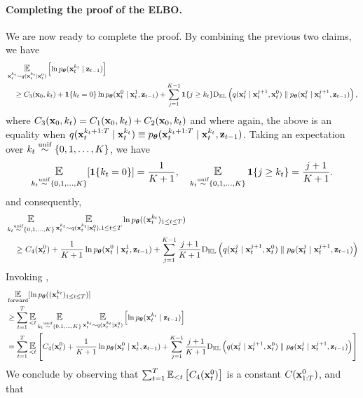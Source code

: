 \paragraph{Completing the proof of the ELBO.} We are now ready to complete the proof. By combining the previous two claims, we have
\begin{align*}
&\Exp_{\bx_t^{k_t} \sim q(\bx_t^{k_t} \mid \bx_t^0)}\left[\ln \ptheta(\bx_{t}^{k_t} \mid \bz_{t-1})\right] \\
&\quad\ge C_3(\bx_0,k_t) + \I\{k_t = 0\}\ln \ptheta(\bx_t^{0} \mid \bx_{t}^{1},  \bz_{t-1}) +  \sum_{j=1}^{K-1}\I\{j \ge k_t\}\Dkl\left(q(\bx_{t}^{j} \mid \bx_t^{j+1},\bx_t^0) \parallel \ptheta(\bx_{t}^{j} \mid \bx_{t}^{j+1}, \bz_{t-1})\right),
\end{align*}
where $C_3(\mathbf{x}_0,k_t) = C_1(\mathbf{x}_0,k_t)+C_2(\mathbf{x}_0,k_t)$ and where again, the above is an equality when $q(\mathbf{x}_{t}^{k_t+1:T} \mid \mathbf{x}_t^{k_t}) \equiv p_{\bm{\theta}}(\mathbf{x}_{t}^{k_t+1:T} \mid \mathbf{x}_t^{k_t},\mathbf{z}_{t-1})$. Taking an expectation over $k_t\overset{\mathrm{unif}}{\sim}\{0,1,\dots,K\}$, we have
\begin{align}
\Exp_{k_t \unifsim\{0,1,\dots,K\}}[\I\{k_t = 0\}] = \frac{1}{K+1}, \quad \Exp_{k_t \unifsim\{0,1,\dots,K\}}\I\{j \ge k_t\} = \frac{j+1}{K+1}.
\end{align}
and consequently,
\begin{align*}
&\Exp_{k_t \unifsim\{0,1,\dots,K\}}\Exp_{\bx_t^{k_t} \sim q(\bx_t^{k_t} \mid \bx_t^0), 1 \le t \le T} \ln \ptheta((\bx_{t}^{k_t})_{1 \le t \le T})\\
&\quad\ge C_4(\bx_t^0) +\frac{1}{K+1}\ln \ptheta(\bx_t^{0} \mid \bx_{t}^{1},  \bz_{t-1}) +  \sum_{j=1}^{K-1}\frac{j+1}{K+1}\Dkl\left(q(\bx_{t}^{j} \mid \bx_t^{j+1},\bx_t^0) \parallel \ptheta(\bx_{t}^{j} \mid \bx_{t}^{j+1}, \bz_{t-1})\right)
\end{align*}
Invoking ,
\begin{align*} 
&\Eforward[\ln  \ptheta((\bx_{t}^{k_t})_{1 \le t \le T})] \\
&\ge \sum_{t=1}^T \Exp_{<t}\Exp_{k_t \unifsim\{0,1,\dots,K\}}\Exp_{\bx_t^{k_t} \sim q(\bx_t^{k_t} \mid \bx_t^0)}\left[\ln \ptheta(\bx_{t}^{k_t} \mid \bz_{t-1})\right]\\
&=\sum_{t=1}^T \Exp_{<t} \left[C_4(\bx_t^0) +\frac{1}{K+1}\ln \ptheta(\bx_t^{0} \mid \bx_{t}^{1},  \bz_{t-1}) +  \sum_{j=1}^{K-1}\frac{j+1}{K+1}\Dkl\left(q(\bx_{t}^{j} \mid \bx_t^{j+1},\bx_t^0) \parallel \ptheta(\bx_{t}^{j} \mid \bx_{t}^{j+1}, \bz_{t-1})\right)\right]
\end{align*}
We conclude by observing that $\sum_{t=1}^T \Exp_{<t} \left[C_4(\bx_t^0)\right]$ is a constant $C(\mathbf{x}_{1:T}^0)$, and that 
